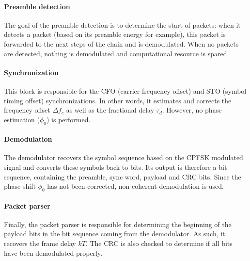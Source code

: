 \paragraph{Preamble detection}
The goal of the preamble detection is to determine the start of packets: when it detects a packet (based on its preamble energy for example), this packet is forwarded to the next steps of the chain and is demodulated. When no packets are detected, nothing is demodulated and computational resource is spared.

\paragraph{Synchronization}
This block is responsible for the CFO (carrier frequency offset) and STO (symbol timing offset) synchronizations. In other words, it estimates and corrects the frequency offset $\Delta f_c$ as well as the fractional delay $\tau_d$. However, no phase estimation ($\phi_0$) is performed.


\paragraph{Demodulation}
The demodulator recovers the symbol sequence based on the CPFSK modulated signal and converts these symbols back to bits. Its output is therefore a bit sequence, containing the preamble, sync word, payload and CRC bits. Since the phase shift $\phi_0$ has not been corrected, non-coherent demodulation is used.

\paragraph{Packet parser}
Finally, the packet parser is responsible for determining the beginning of the payload bits in the bit sequence coming from the demodulator. As such, it recovers the frame delay $kT$. The CRC is also checked to determine if all bits have been demodulated properly.

